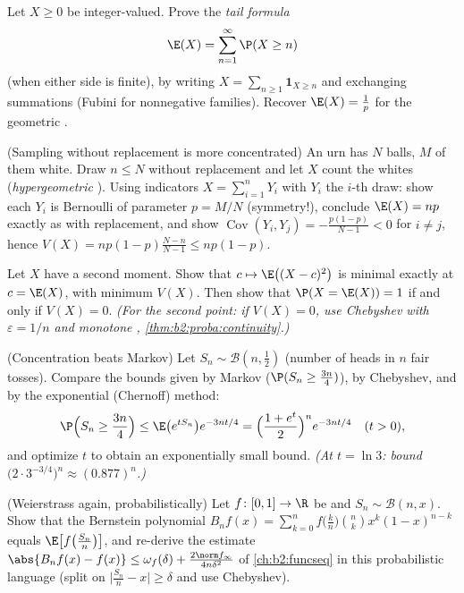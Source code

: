 \begin{exercise}[$\star\star$]\label{exo:b2:randomvar:4}
Let $X \geq 0$ be integer-valued. Prove the \emph{tail formula}
\[
\E(X) = \sum_{n=1}^{\infty} \P(X \geq n)
\]
(when either side is finite), by writing $X =
\sum_{n\geq1}\mathbf{1}_{X \geq n}$ and exchanging summations
(Fubini for nonnegative families). Recover $\E(X) = \frac1p$ for
the geometric .
\end{exercise}

\begin{exercise}[$\star\star$]\label{exo:b2:randomvar:5}
(Sampling without replacement is more concentrated) An urn has $N$
balls, $M$ of them white. Draw $n \leq N$ without replacement and
let $X$ count the whites (\emph{hypergeometric} ). Using
indicators $X = \sum_{i=1}^n Y_i$ with $Y_i$ the $i$-th draw:
show each $Y_i$ is Bernoulli of parameter $p = M/N$ (symmetry!),
conclude $\E(X) = np$ exactly as with replacement, and show
$\operatorname{Cov}(Y_i, Y_j) = -\frac{p(1-p)}{N-1} < 0$ for $i
\neq j$, hence $V(X) = np(1-p)\frac{N - n}{N - 1} \leq np(1-p)$.
\end{exercise}

\begin{exercise}[$\star\star$]\label{exo:b2:randomvar:6}
Let $X$ have a second moment. Show that $c \mapsto \E\bigl((X -
c)^2\bigr)$ is minimal exactly at $c = \E(X)$, with minimum
$V(X)$. Then show that $\P(X = \E(X)) = 1$ if and only if $V(X) =
0$. \emph{(For the second point: if $V(X) = 0$, use Chebyshev
with $\varepsilon = 1/n$ and monotone ,
\cref{thm:b2:proba:continuity}.)}
\end{exercise}

\begin{exercise}[$\star\star\star$]\label{exo:b2:randomvar:7}
(Concentration beats Markov) Let $S_n \sim \mathcal{B}(n,
\frac12)$ (number of heads in $n$ fair tosses). Compare the
bounds given by Markov ($\P(S_n \geq \frac{3n}{4})$), by Chebyshev,
and by the exponential (Chernoff) method:
\[
\P\Bigl(S_n \geq \frac{3n}4\Bigr)
\leq \E\bigl(e^{tS_n}\bigr)e^{-3nt/4}
= \Bigl(\frac{1 + e^t}{2}\Bigr)^n e^{-3nt/4}
\quad (t > 0),
\]
and optimize $t$ to obtain an exponentially small bound. \emph{(At
$t = \ln 3$: bound $\bigl(2\cdot 3^{-3/4}\bigr)^n \approx
(0.877)^n$.)}
\end{exercise}

\begin{exercise}[$\star\star\star$]\label{exo:b2:randomvar:8}
(Weierstrass again, probabilistically) Let $f \colon [0,1] \to \R$
be  and $S_n \sim \mathcal{B}(n, x)$. Show that the
Bernstein polynomial $B_nf(x) = \sum_{k=0}^n f\bigl(\frac
kn\bigr)\binom nk x^k(1-x)^{n-k}$ equals
$\E\bigl[f\bigl(\frac{S_n}{n}\bigr)\bigr]$, and re-derive the
estimate $\abs{B_nf(x) - f(x)} \leq \omega_f(\delta) +
\frac{2\norm f_\infty}{4n\delta^2}$ of \cref{ch:b2:funcseq} in
this probabilistic language (split on $\bigl|\frac{S_n}{n} -
x\bigr| \geq \delta$ and use Chebyshev).
\end{exercise}

